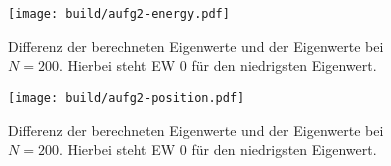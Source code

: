 \begin{figure}
  \centering
  \texttt{[image: build/aufg2-energy.pdf]}
  \caption{Differenz der berechneten Eigenwerte und der Eigenwerte bei $N = \num{200}$.
  Hierbei steht EW 0 für den niedrigsten Eigenwert.}
  \label{eqn:energy-vergleich}
\end{figure}
\begin{figure}
  \centering
  \texttt{[image: build/aufg2-position.pdf]}
  \caption{Differenz der berechneten Eigenwerte und der Eigenwerte bei $N = \num{200}$.
  Hierbei steht EW 0 für den niedrigsten Eigenwert.}
  \label{eqn:position-vergleich}
\end{figure}
